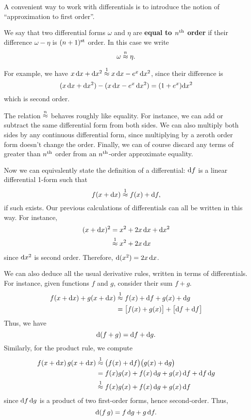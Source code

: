 \documentclass[12pt]{amsart}
\begin{document}
A convenient way to work with differentials is to introduce the notion of ``approximation to first order''.

\begin{defn}
  We say that two differential forms $\omega$ and $\eta$ are \textbf{equal to $n^{\mathrm{th}}$ order} if their difference $\omega-\eta$ is $(n+1)^{\mathrm{st}}$ order.
  In this case we write
  \[\omega\mathrel{\overset{n}{\approx}} \eta.\]
\end{defn}

For example, we have $x\,\mathrm{d} x + \mathrm{d} x^2 \mathrel{\overset{1}{\approx}} x\,\mathrm{d} x - e^x \,\mathrm{d} x^2$, since their difference is
\[ (x\,\mathrm{d} x + \mathrm{d} x^2) - (x\,\mathrm{d} x - e^x\, \mathrm{d} x^2) = (1+e^x)\mathrm{d} x^2 \]
which is second order.

The relation $\mathrel{\overset{n}{\approx}}$ behaves roughly like equality.
For instance, we can add or subtract the same differential form from both sides.
We can also multiply both sides by any continuous differential form, since multiplying by a zeroth order form doesn't change the order.
Finally, we can of course discard any terms of greater than $n^{\mathrm{th}}$ order from an $n^{\mathrm{th}}$-order approximate equality.

Now we can equivalently state the definition of a differential: $\mathrm{d} f$ is a linear differential 1-form such that
\[ f(x+\mathrm{d} x) \mathrel{\overset{1}{\approx}} f(x) + \mathrm{d} f, \]
if such exists.
Our previous calculations of differentials can all be written in this way.
For instance,
\begin{align*}
  (x+\mathrm{d} x)^2 &= x^2 + 2 x\,\mathrm{d} x + \mathrm{d} x^2\\
  &\mathrel{\overset{1}{\approx}} x^2 + 2 x\,\mathrm{d} x
\end{align*}
since $\mathrm{d} x^2$ is second order.
Therefore, $\mathrm{d}(x^2) = 2x\,\mathrm{d} x$.

We can also deduce all the usual derivative rules, written in terms of differentials.
For instance, given functions $f$ and $g$, consider their sum $f+g$.
\begin{align*}
  f(x+\mathrm{d} x) + g(x+\mathrm{d} x)
  &\mathrel{\overset{1}{\approx}} f(x) + \mathrm{d} f + g(x) + \mathrm{d} g\\
  &= \big[f(x) + g(x)\big] + \big[ \mathrm{d} f + \mathrm{d} f \big]
\end{align*}
Thus, we have
\[ \mathrm{d}(f+g) = \mathrm{d} f + \mathrm{d} g. \]
Similarly, for the product rule, we compute
\begin{align*}
  f(x+\mathrm{d} x) \, g(x+\mathrm{d} x)
  &\mathrel{\overset{1}{\approx}} \big(f(x)+\mathrm{d} f\big)\big(g(x) + \mathrm{d} g \big)\\
  &= f(x) g(x) + f(x) \,\mathrm{d} g + g(x) \,\mathrm{d} f + \mathrm{d} f\,\mathrm{d} g\\
  &\mathrel{\overset{1}{\approx}} f(x) g(x) + f(x) \,\mathrm{d} g + g(x) \,\mathrm{d} f
\end{align*}
since $\mathrm{d} f\,\mathrm{d} g$ is a product of two first-order forms, hence second-order.
Thus,
\[ \mathrm{d}(f\,g) = f\,\mathrm{d} g + g\,\mathrm{d} f.\]
\end{document}

